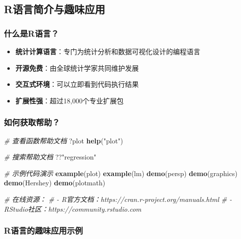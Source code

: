 \documentclass[
  twoside]{book}
\newenvironment{Shaded}{\begin{snugshade}}{\end{snugshade}}
\newcommand{\CommentTok}[1]{\textcolor[rgb]{0.56,0.35,0.01}{\textit{#1}}}
\newcommand{\FunctionTok}[1]{\textcolor[rgb]{0.13,0.29,0.53}{\textbf{#1}}}
\newcommand{\NormalTok}[1]{#1}
\newcommand{\StringTok}[1]{\textcolor[rgb]{0.31,0.60,0.02}{#1}}
\providecommand{\tightlist}{%
  \setlength{\itemsep}{0pt}\setlength{\parskip}{0pt}}
\begin{document}
\hypertarget{rux8bedux8a00ux7b80ux4ecbux4e0eux8da3ux5473ux5e94ux7528}{%
\subsection{R语言简介与趣味应用}\label{rux8bedux8a00ux7b80ux4ecbux4e0eux8da3ux5473ux5e94ux7528}}

\hypertarget{ux4ec0ux4e48ux662frux8bedux8a00}{%
\subsubsection{什么是R语言？}\label{ux4ec0ux4e48ux662frux8bedux8a00}}

\begin{itemize}
\tightlist
\item
  \textbf{统计计算语言}：专门为统计分析和数据可视化设计的编程语言
\item
  \textbf{开源免费}：由全球统计学家共同维护发展
\item
  \textbf{交互式环境}：可以立即看到代码执行结果
\item
  \textbf{扩展性强}：超过18,000个专业扩展包
\end{itemize}

\hypertarget{ux5982ux4f55ux83b7ux53d6ux5e2eux52a9}{%
\subsubsection{如何获取帮助？}\label{ux5982ux4f55ux83b7ux53d6ux5e2eux52a9}}

\begin{Shaded}
\begin{Highlighting}[]
\CommentTok{\# 查看函数帮助文档}
\NormalTok{?plot}
\FunctionTok{help}\NormalTok{(}\StringTok{"plot"}\NormalTok{)}

\CommentTok{\# 搜索帮助文档}
\NormalTok{??}\StringTok{"regression"}

\CommentTok{\# 示例代码演示}
\FunctionTok{example}\NormalTok{(plot)}
\FunctionTok{example}\NormalTok{(lm)}
\FunctionTok{demo}\NormalTok{(persp)}
\FunctionTok{demo}\NormalTok{(graphics)}
\FunctionTok{demo}\NormalTok{(Hershey)}
\FunctionTok{demo}\NormalTok{(plotmath)}


\CommentTok{\# 在线资源：}
\CommentTok{\# {-} R官方文档：https://cran.r{-}project.org/manuals.html}
\CommentTok{\# {-} RStudio社区：https://community.rstudio.com}
\end{Highlighting}
\end{Shaded}

\hypertarget{rux8bedux8a00ux7684ux8da3ux5473ux5e94ux7528ux793aux4f8b}{%
\subsubsection{R语言的趣味应用示例}\label{rux8bedux8a00ux7684ux8da3ux5473ux5e94ux7528ux793aux4f8b}}
\end{document}
